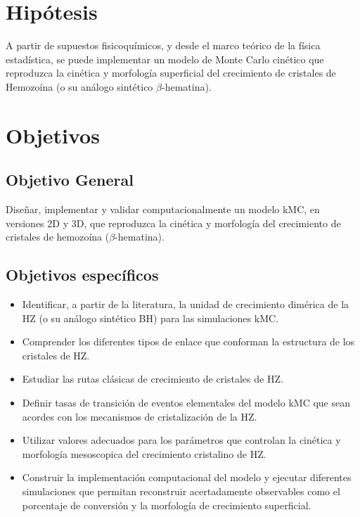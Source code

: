 \documentclass[12pt,letterpaper,oneside]{report}
\begin{document}




\section{Hipótesis}
A partir de supuestos fisicoquímicos, y desde el marco teórico de la física estadística, se puede implementar un modelo de Monte Carlo cinético que reproduzca la cinética y morfología superficial del crecimiento de cristales de Hemozoína (o su análogo sintético $\beta$-hematina).\\

\section{Objetivos}
\subsection*{Objetivo General}
Diseñar, implementar y validar computacionalmente un modelo kMC, en versiones 2D y 3D, que reproduzca la cinética y morfología del crecimiento de cristales de hemozoína ($\beta$-hematina).\\

\subsection*{Objetivos específicos}
\begin{itemize}

    \item Identificar, a partir de la literatura, la unidad de crecimiento dimérica de la HZ (o su análogo sintético BH) para las simulaciones kMC.

    \item Comprender los diferentes tipos de enlace que conforman la estructura de los cristales de HZ.

    \item Estudiar las rutas clásicas de crecimiento de cristales de HZ.

    \item Definir tasas de transición de eventos elementales del modelo kMC que sean acordes con los mecanismos de cristalización de la HZ.

    \item Utilizar valores adecuados para los parámetros que controlan la cinética y morfología mesoscopica del crecimiento cristalino de HZ.

    \item Construir la implementación computacional del modelo y ejecutar diferentes simulaciones que permitan reconstruir acertadamente observables como el porcentaje de conversión y la morfología de crecimiento superficial.
    
\end{itemize}\\
\end{document}
